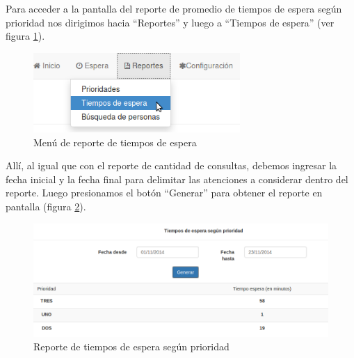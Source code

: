 Para acceder a la pantalla del reporte de promedio de tiempos de espera según prioridad nos dirigimos hacia ``Reportes'' y luego a ``Tiempos de espera'' (ver figura \ref{fig:menu_reporte_tiempos_espera}).
\begin{figure}
\centerline{\includegraphics[width=0.7\textwidth]{menu_reporte_tiempos_espera.png}}
\caption{Menú de reporte de tiempos de espera}
\label{fig:menu_reporte_tiempos_espera}
\end{figure}
Allí, al igual que con el reporte de cantidad de consultas, debemos ingresar la fecha inicial y la fecha final para delimitar las atenciones a considerar dentro del reporte. Luego presionamos el botón ``Generar'' para obtener el reporte en pantalla (figura \ref{fig:reporte_tiempos_espera}).
\begin{figure}
\centerline{\includegraphics[width=1\textwidth]{reporte_tiempos_espera.png}}
\caption{Reporte de tiempos de espera según prioridad}
\label{fig:reporte_tiempos_espera}
\end{figure}

